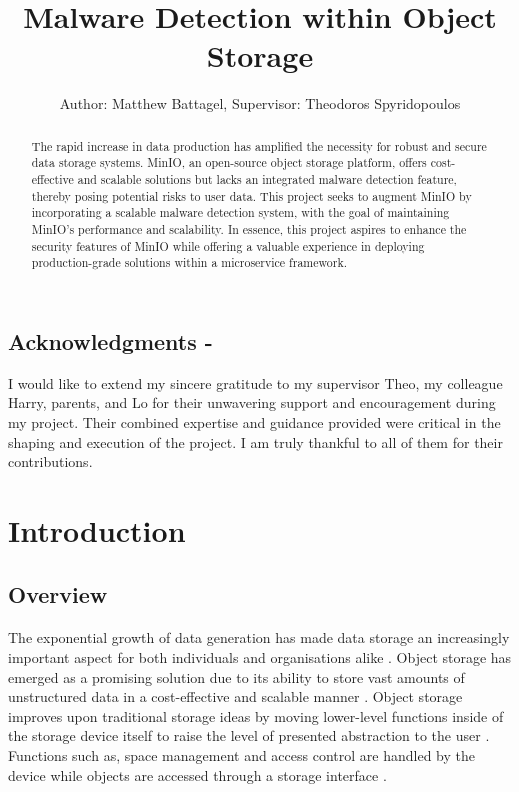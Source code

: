 \documentclass[12pt, conference, final, a4paper, onecolumn, compsoc]{IEEEtran}
\begin{document}
\title{Malware Detection within Object Storage} \author{Author: Matthew
  Battagel, Supervisor: Theodoros Spyridopoulos} 
\maketitle{}

\subsection*{Acknowledgments - }

I would like to extend my sincere gratitude to my supervisor Theo, my colleague
Harry, parents, and Lo for their unwavering support and encouragement during my
project. Their combined expertise and guidance provided were critical in the
shaping and execution of the project. I am truly thankful to all of them for
their contributions.

\bigskip

\begin{abstract}
  The rapid increase in data production has amplified the necessity for robust
  and secure data storage systems. MinIO, an open-source object storage
  platform, offers cost-effective and scalable solutions but lacks an integrated
  malware detection feature, thereby posing potential risks to user data. This
  project seeks to augment MinIO by incorporating a scalable malware detection
  system, with the goal of maintaining MinIO's performance and scalability. In
  essence, this project aspires to enhance the security features of MinIO while
  offering a valuable experience in deploying production-grade solutions within
  a microservice framework.
\end{abstract}

\pagebreak

\tableofcontents{}

\pagebreak

\section{Introduction}
\subsection{Overview}
\paragraph{}
The exponential growth of data generation has made data storage an increasingly
important aspect for both individuals and organisations alike
\citep{data-storage}. Object storage has emerged as a promising solution due to
its ability to store vast amounts of unstructured data in a cost-effective and
scalable manner \citep{object-storage-market}. Object storage improves upon
traditional storage ideas by moving lower-level functions inside of the storage
device itself to raise the level of presented abstraction to the
user \citep{object-storage}. Functions such as, space management and access
control are handled by the device while objects are accessed through a
storage interface \citep{object-storage}.
\end{document}
